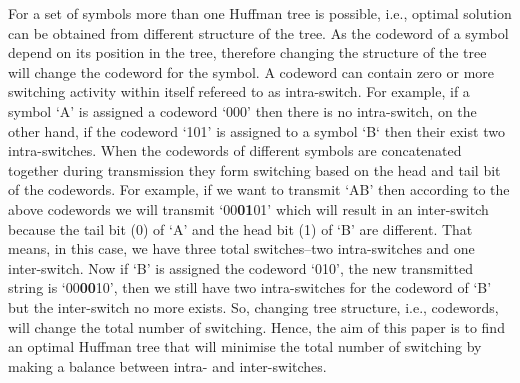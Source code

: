 \documentclass[preprint,12pt]{elsarticle}
\begin{document}
For a set of symbols more than one Huffman tree is possible, i.e., optimal solution can be obtained from different structure of the tree. As the codeword of a symbol depend on its position in the tree, therefore changing the structure of the tree will change the codeword for the symbol. A codeword can contain zero or more switching activity within itself refereed to as intra-switch. For example, if a symbol `A' is assigned a codeword `000' then there is no intra-switch, on the other hand, if the codeword `101' is assigned to a symbol `B` then their exist two intra-switches. When the codewords of different symbols are concatenated together during transmission they form switching based on the head and tail bit of the codewords. For example, if we want to transmit `AB' then according to the above codewords we will transmit `00\textbf{01}01' which will result in an inter-switch because the tail bit (0) of `A' and the head bit (1) of `B' are different. That means, in this case, we have three total switches--two intra-switches and one inter-switch. Now if `B' is assigned the codeword `010', the new transmitted string is `00\textbf{00}10', then we still have two intra-switches for the codeword of `B' but the inter-switch no more exists. So, changing tree structure, i.e., codewords, will change the total number of switching. Hence, the aim of this paper is to find an optimal Huffman tree that will minimise the total number of switching by making a balance between intra- and inter-switches.
\end{document}
